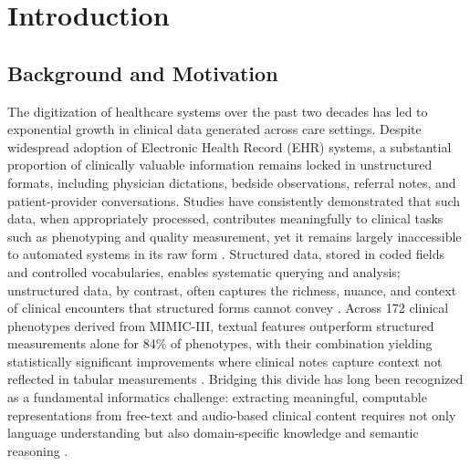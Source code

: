 \section{Introduction}

\subsection{Background and Motivation}

The digitization of healthcare systems over the past two decades has led to exponential growth in clinical data generated across care settings. Despite widespread adoption of Electronic Health Record (EHR) systems, a substantial proportion of clinically valuable information remains locked in unstructured formats, including physician dictations, bedside observations, referral notes, and patient-provider conversations. Studies have consistently demonstrated that such data, when appropriately processed, contributes meaningfully to clinical tasks such as phenotyping and quality measurement, yet it remains largely inaccessible to automated systems in its raw form \cite{hong2020nlp2fhir}. Structured data, stored in coded fields and controlled vocabularies, enables systematic querying and analysis; unstructured data, by contrast, often captures the richness, nuance, and context of clinical encounters that structured forms cannot convey \cite{hong2017integrating, brens2025semantic}. Across 172 clinical phenotypes derived from MIMIC-III, textual features outperform structured measurements alone for 84\% of phenotypes, with their combination yielding statistically significant improvements where clinical notes capture context not reflected in tabular measurements \cite{moldwin2021phenotyping}. Bridging this divide has long been recognized as a fundamental informatics challenge: extracting meaningful, computable representations from free-text and audio-based clinical content requires not only language understanding but also domain-specific knowledge and semantic reasoning \cite{builtjes2025leveraging}.

